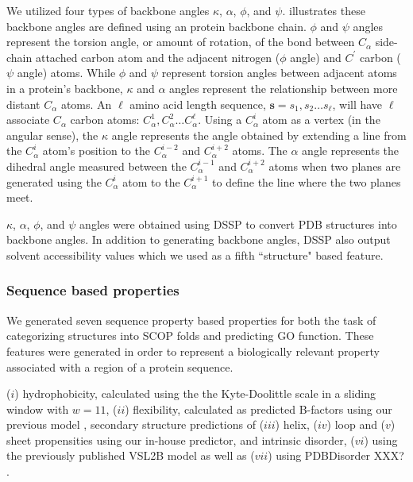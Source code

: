 We utilized four types of backbone angles $\kappa$, $\alpha$, $\phi$, and $\psi$.   illustrates these backbone angles are defined using an protein backbone chain. $\phi$ and $\psi$ angles represent the torsion angle, or amount of rotation, of the bond between $C_{\alpha}$ side-chain  attached carbon atom and the adjacent nitrogen ($\phi$ angle) and $C^{\prime}$ carbon ($\psi$ angle) atoms. While $\phi$ and $\psi$ represent torsion angles between adjacent atoms in a protein's backbone, $\kappa$ and $\alpha$ angles represent the relationship between more distant $C_{\alpha}$ atoms.  An $\ell$ amino acid length sequence, $\mathbf{s}=s_{1},s_{2}\ldots s_{\ell}$, will have $\ell$ associate $C_{\alpha}$ carbon atoms:   $C_{\alpha}^{1}, C_{\alpha}^{2} \ldots C_{\alpha}^{\ell}$. Using a $C_{\alpha}^{i}$ atom as a vertex (in the angular sense), the $\kappa$ angle represents the angle obtained by extending a line from the $C_{\alpha}^{i}$ atom's position to the $C_{\alpha}^{i-2}$ and $C_{\alpha}^{i+2}$ atoms.  The $\alpha$ angle represents the dihedral angle measured between the $C_{\alpha}^{i-1}$ and $C_{\alpha}^{i+2}$ atoms when two planes are generated using the $C_{\alpha}^{i}$ atom to the $C_{\alpha}^{i+1}$ to define the line where the two planes meet.

$\kappa$, $\alpha$, $\phi$, and $\psi$ angles were obtained using DSSP \citep{Kabsch1983} to convert PDB structures into backbone angles.  In addition to generating backbone angles, DSSP also output solvent accessibility values which we used as a fifth ``structure" based feature.


\subsubsection{Sequence based properties}

We generated seven sequence property based properties for both the task of categorizing structures into SCOP folds and predicting GO function.  These features were generated in order to represent a biologically relevant property associated with a region of a protein sequence.  

($i$) hydrophobicity, calculated using the the Kyte-Doolittle scale \citep{Kyte1982} in a sliding window with $w=11$, ($ii$) flexibility, calculated as predicted B-factors using our previous model \citep{Smith2003}, secondary structure predictions of ($iii$) helix, ($iv$) loop and ($v$) sheet propensities using our in-house predictor, and intrinsic disorder, ($vi$) using the previously published VSL2B model \citep{Peng2006} as well as ($vii$) using PDBDisorder XXX? . 

